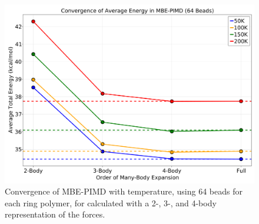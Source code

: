 \begin{figure}[t]
\uwsinglespace
\begin{center}
\begin{minipage}{0.8\textwidth}
\includegraphics[width=\textwidth]{Figures/Chapter_4/ch4_figure_8.png}
\end{minipage}
\end{center}
\begin{spacing}{1.0}
\caption[Convergence of MBE-PIMD with temperature, using 64 beads for each ring polymer, for  calculated with a 2-, 3-, and 4-body representation of the forces.]{Convergence of MBE-PIMD with temperature, using 64 beads for each ring polymer, for  calculated with a 2-, 3-, and 4-body representation of the forces.}\label{fig:MBE_MD_F8}
\end{spacing}
\end{figure}